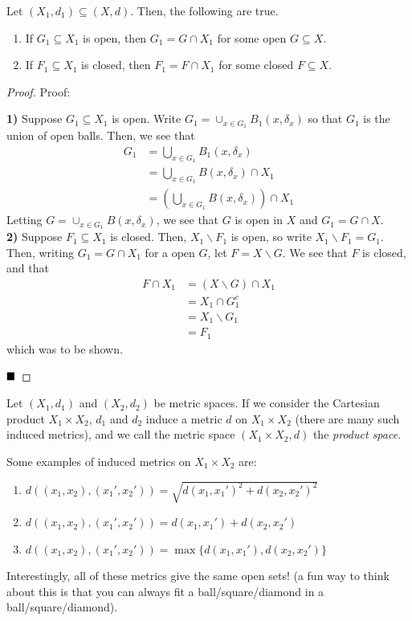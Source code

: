 \begin{lemma}
	Let $(X_1, d_1) \subseteq (X, d)$. Then, the following are true.
	\begin{enumerate}
		\item If $G_1 \subseteq X_1$ is open, then $G_1 = G \cap X_1$ for some open $G \subseteq X$. 
		\item If $F_1 \subseteq X_1$ is closed, then $F_1 = F \cap X_1$ for some closed $F \subseteq X$. 
	\end{enumerate}
\end{lemma}
\begin{proof}{Proof:}
	
	\textbf{1)} Suppose $G_1 \subseteq X_1$ is open. Write $G_1 = \cup_{x \in G_1} B_1(x, \delta_x)$ so that $G_1$ is the union of open balls. Then, we see that
	\begin{align*}
		G_1 &= \bigcup_{x \in G_1} B_1(x, \delta_x)\\
		&= \bigcup_{x \in G_1} B(x, \delta_x) \cap X_1\\
		&= \left(\bigcup_{x \in G_1} B(x, \delta_x)\right) \cap X_1
	\end{align*}
	Letting $G = \cup_{x \in G_1} B(x, \delta_x)$, we see that $G$ is open in $X$ and $G_1 = G \cap X$.\\

	\textbf{2)} Suppose $F_1 \subseteq X_1$ is closed. Then, $X_1 \backslash F_1$ is open, so write $X_1 \backslash F_1 = G_1$. Then, writing $G_1 = G \cap X_1$ for a open $G$, let $F = X \backslash G$. We see that $F$ is closed, and that
	\begin{align*}
		F \cap X_1 &= (X \backslash G) \cap X_1\\
		&= X_1 \cap G_1^{c}\\
		&= X_1 \backslash G_1\\
		&= F_1
	\end{align*}
	which was to be shown.

	$\qed$
\end{proof}

\begin{definition}
	Let $(X_1, d_1)$ and $(X_2, d_2)$ be metric spaces. If we consider the Cartesian product $X_1 \times X_2$, $d_1$ and $d_2$ induce a metric $d$ on $X_1 \times X_2$ (there are many such induced metrics), and we call the metric space $(X_1 \times X_2, d)$ the \emph{product space.}
\end{definition}

Some examples of induced metrics on $X_1 \times X_2$ are:
\begin{enumerate}
	\item $d((x_1, x_2), (x_1', x_2')) = \sqrt{d(x_1, x_1')^2 + d(x_2, x_2')^2}$\\
	\item $d((x_1, x_2), (x_1', x_2')) = d(x_1, x_1') + d(x_2, x_2')$\\
	\item $d((x_1, x_2), (x_1', x_2')) = \max\{d(x_1, x_1'), d(x_2, x_2')\}$
\end{enumerate}
Interestingly, all of these metrics give the same open sets! (a fun way to think about this is that you can always fit a ball/square/diamond in a ball/square/diamond). 
